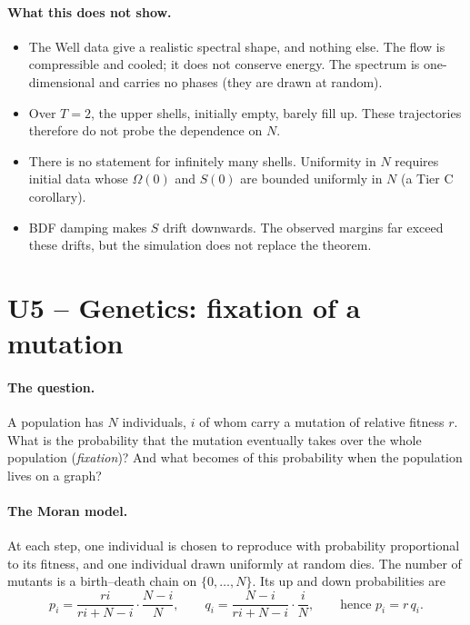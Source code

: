 \paragraph{What this does not show.}
\begin{itemize}
\item The Well data give a realistic spectral shape, and nothing else. The flow is compressible
and cooled; it does not conserve energy. The spectrum is one-dimensional and carries no phases (they are
drawn at random).
\item Over $T=2$, the upper shells, initially empty, barely fill up. These trajectories therefore do not probe
the dependence on $N$.
\item There is no statement for infinitely many shells. Uniformity in $N$ requires initial data whose
$\Omega(0)$ and $S(0)$ are bounded uniformly in $N$ (a Tier C corollary).
\item BDF damping makes $S$ drift downwards. The observed margins far exceed these drifts,
but the simulation does not replace the theorem.
\end{itemize}

\section{U5 -- Genetics: fixation of a mutation}\label{ch5:U5}

\paragraph{The question.} A population has $N$ individuals, $i$ of whom carry a mutation of relative
fitness $r$. What is the probability that the mutation eventually takes over the whole population
(\emph{fixation})? And what becomes of this probability when the population lives on a graph?

\paragraph{The Moran model.} At each step, one individual is chosen to reproduce with probability
proportional to its fitness, and one individual drawn uniformly at random dies. The number of mutants is a
birth--death chain on $\{0,\dots,N\}$. Its up and down probabilities are
\[p_i=\frac{ri}{ri+N-i}\cdot\frac{N-i}{N},\qquad q_i=\frac{N-i}{ri+N-i}\cdot\frac iN,\qquad\text{hence } p_i=r\,q_i .\]

